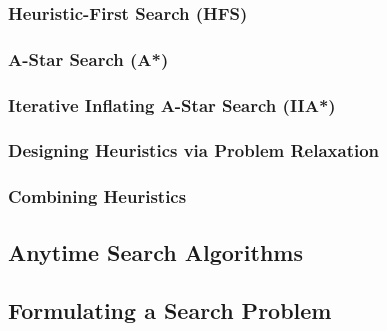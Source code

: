 \subsubsection{Heuristic-First Search (HFS)}

\subsubsection{A-Star Search (A*)}

\subsubsection{Iterative Inflating A-Star Search (IIA*)}

\subsubsection{Designing Heuristics via Problem Relaxation}

\subsubsection{Combining Heuristics}

\subsection{Anytime Search Algorithms}

\subsection{Formulating a Search Problem}






